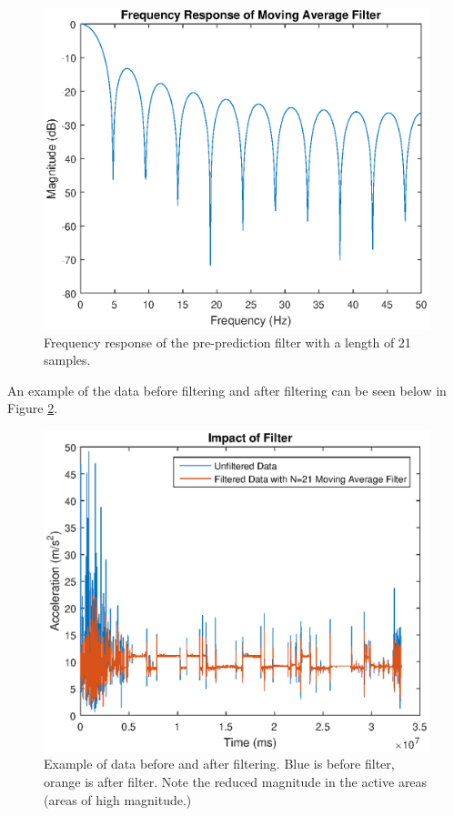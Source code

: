             \begin{figure}[h]
                \includegraphics[width=\textwidth]{Images/sleep_pre_filter.eps}
                \centering
                \caption{Frequency response of the pre-prediction filter with a length of 21 samples.}
                \label{img_pp_filter}
            \end{figure}

            An example of the data before filtering and after filtering can be seen below in Figure \ref{img_pp_filter_ex}.

            \begin{figure}[h]
                \includegraphics[width=\textwidth]{Images/sleep_pre_filter_ex.eps}
                \centering
                \caption{Example of data before and after filtering. Blue is before filter, orange is after filter. Note the reduced magnitude in the active areas (areas of high magnitude.)}
                \label{img_pp_filter_ex}
            \end{figure}

